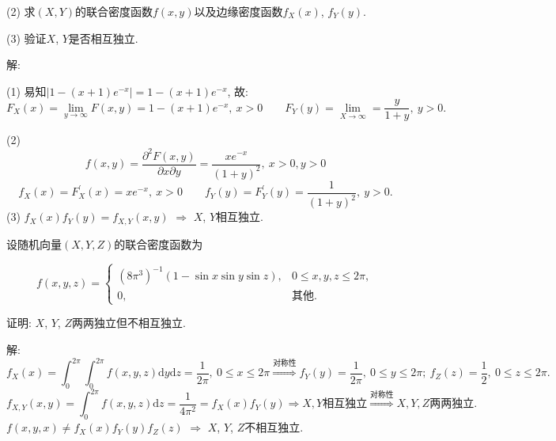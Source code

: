 \documentclass[standard]{ExBook}
\begin{document}
\begin{qitems}
\begin{bbox}
\begin{shaded}
(2) 求$(X,Y)$的联合密度函数$f(x,y)$以及边缘密度函数$f_{X}(x)$, $f_{Y}(y)$.

(3) 验证$X$, $Y$是否相互独立.
    \end{shaded}
    \end{bbox}

\vspace{-5em}

    \begin{bbox}
解: 

(1) 易知$|1-(x+1)e^{-x}|=1-(x+1)e^{-x}$, 故:
$$F_{X}(x)=\lim\limits_{y\to\infty}F(x,y)=1-(x+1)e^{-x},\ x>0\qquad F_{Y}(y)=\lim\limits_{X\to\infty}=\frac{y}{1+y},\ y>0.$$

(2)
$$f(x,y)=\frac{\partial^2 F(x,y)}{\partial x\partial y}=\frac{x e^{-x}}{(1+y)^2},\ x>0,y>0$$
$$f_{X}(x)=F_{X}^{'}(x)=x e^{-x},\ x>0\qquad f_{Y}(y)=F_{Y}^{'}(y)=\frac{1}{(1+y)^2},\ y>0.$$
(3) $f_{X}(x)f_{Y}(y)=f_{X,Y}(x,y)$ $\Longrightarrow$ $X$, $Y$相互独立.
    \end{bbox}

\vspace{-5em}

    \begin{bbox}
    \begin{shaded}
        \qitem
设随机向量$(X,Y,Z)$的联合密度函数为
\vspace{-2em}
\begin{center}
\begin{equation}
    f(x,y,z)=
    \left\{
    \begin{array}{cl}
        \nonumber
        (8\pi^{3})^{-1}(1-\sin x\sin y\sin z), & 0\leq x,y,z\leq2\pi,\\
        0, & \text{其他}.
    \end{array}
    \right.
\end{equation}
\end{center}
证明: $X$, $Y$, $Z$两两独立但不相互独立.
    \end{shaded}
    \end{bbox}

\vspace{-5em}

    \begin{bbox}
解: 
$$f_{X}(x)=\int_{0}^{2\pi}\int_{0}^{2\pi}f(x,y,z)\mathrm{d}y\mathrm{d}z=\frac{1}{2\pi},\ 0\leq x\leq 2\pi \overset{\text{对称性}}{\Longrightarrow} f_{Y}(y)=\frac{1}{2\pi},\ 0\leq y\leq 2\pi;\ f_{Z}(z)=\frac{1}{2},\ 0\leq z\leq 2\pi.$$
$$f_{X,Y}(x,y)=\int_{0}^{2\pi}f(x,y,z)\mathrm{d}z=\frac{1}{4\pi^2}=f_{X}(x)f_{Y}(y) \Longrightarrow X,Y\text{相互独立} \overset{\text{对称性}}{\Longrightarrow} X,Y,Z\text{两两独立}.$$
$f(x,y,x)\neq f_{X}(x)f_{Y}(y)f_{Z}(z)$ $\Longrightarrow$ $X$, $Y$, $Z$不相互独立.
    \end{bbox}


\end{qitems}
\end{document}

